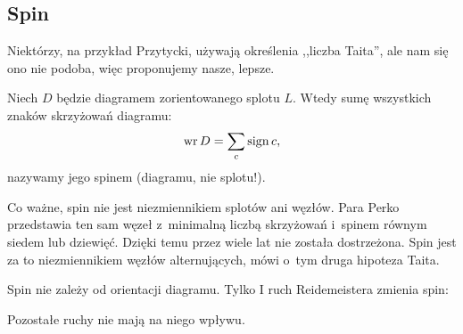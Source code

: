 
\subsection{Spin}
%

Niektórzy, na przykład Przytycki, używają określenia ,,liczba Taita'', ale nam się ono nie podoba, więc proponujemy nasze, lepsze.
%

\begin{definition}[spin]
    Niech $D$ będzie diagramem zorientowanego splotu $L$.
    Wtedy sumę wszystkich znaków skrzyżowań diagramu:
    \begin{equation}
        \operatorname{wr} D = \sum_c \operatorname{sign} c,
    \end{equation}
    nazywamy jego spinem (diagramu, nie splotu!).
\end{definition}

Co ważne, spin nie jest niezmiennikiem splotów ani węzłów.
Para Perko przedstawia ten sam węzeł z~minimalną liczbą skrzyżowań i~spinem równym siedem lub dziewięć.
%
Dzięki temu przez wiele lat nie została dostrzeżona.
Spin jest za to niezmiennikiem węzłów alternujących, mówi o~tym druga hipoteza Taita.
%

\begin{lemma}
\label{lem:writhe_reidemeister}%
    Spin nie zależy od orientacji diagramu.
    Tylko I ruch Reidemeistera zmienia spin:
\begin{comment}
    \begin{equation}
        \writhe \left(\MedLarReidemeisterOneLeft\right) =
        \writhe \left(\MedLarReidemeisterOneStraight\right) - 1.
    \end{equation}
\end{comment}
    Pozostałe ruchy nie mają na niego wpływu.
\end{lemma}

%



